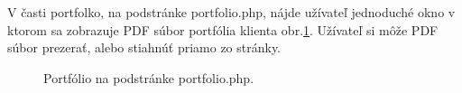 V časti portfolko, na podstránke portfolio.php, nájde užívateľ jednoduché okno v ktorom sa zobrazuje PDF súbor portfólia klienta obr.\ref{OBRAZOK 1.7}. Užívateľ si môže PDF súbor prezerať, alebo stiahnúť priamo zo stránky.

\begin{figure}[!tbh]
\centering
\setlength{\fboxsep}{0pt}%
\setlength{\fboxrule}{1pt}%
\caption{Portfólio na podstránke portfolio.php.}\label{OBRAZOK 1.7}
\end{figure}





